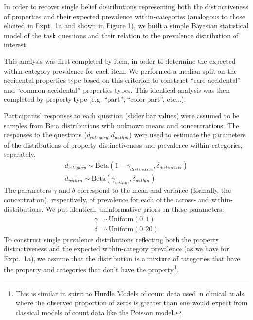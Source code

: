 \documentclass[10pt,letterpaper]{article}
\begin{document}
In order to recover single belief distributions representing both the distinctiveness of properties and their expected prevalence within-categories (analogous to those elicited in Expt.~1a and shown in Figure 1), we built a simple Bayesian statistical model of the task questions and their relation to the prevalence distribution of interest. 

This analysis was first completed by item, in order to determine the expected within-category prevalence for each item. 
We performed a median split on the accidental properties type based on this criterion to construct ``rare accidental'' and ``common accidental'' properties types. 
This identical analysis was then completed by property type (e.g. ``part'', ``color part'', etc...).

Participants' responses to each question (slider bar values) were assumed to be samples from Beta distributions with unknown means and concentrations. 
The responses to the questions ($d_{category}, d_{within}$) were used to estimate the parameters of the distributions of property distinctiveness and prevalence within-categories, separately. 
\begin{align*}
d_{category} \sim \text{Beta}(1-\gamma_{distinctive}, \delta_{distinctive}) \\
d_{within} \sim \text{Beta}(\gamma_{within}, \delta_{within}) 
\end{align*}
The parameters $\gamma$ and $\delta$ correspond to the mean and variance (formally, the concentration), respectively, of prevalence for each of the across- and within- distributions.
We put identical, uninformative priors on these parameters:
\begin{align*}
\gamma & \sim \text{Uniform}(0,1) \\
\delta & \sim \text{Uniform}(0,20) 
\end{align*}
To construct single prevalence distributions reflecting both the property distinctiveness and the expected within-category prevalence (as we have for Expt.~1a), we assume that the distribution is a mixture of categories that have the property and categories that don't have the property\footnote{This is similar in spirit to Hurdle Models of count data used in clinical trials where the observed proportion of zeros is greater than one would expect from classical models of count data like the Poisson model.}. 
\end{document}
